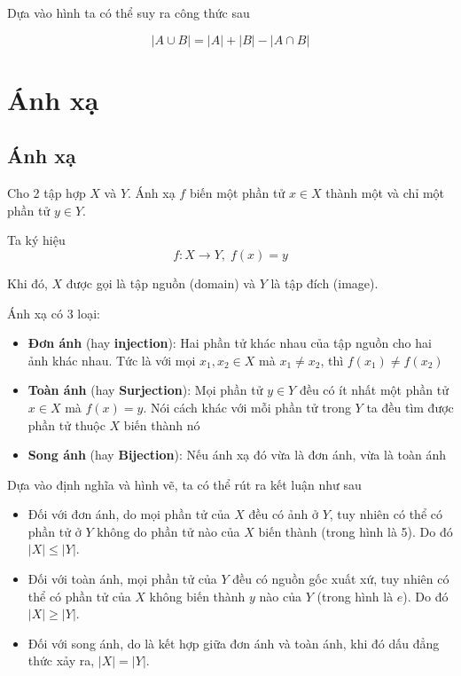 Dựa vào hình ta có thể suy ra công thức sau

\begin{equation}
    \lvert A \cup B \rvert = \lvert A \rvert + \lvert B \rvert - \lvert A \cap B \rvert
\end{equation}

\section{Ánh xạ}

\subsection*{Ánh xạ}

Cho 2 tập hợp $X$ và $Y$. Ánh xạ $f$ biến một phần tử $x \in X$ thành một và chỉ một phần tử $y \in Y$.

Ta ký hiệu
\[f: X \to Y, \; f(x) = y\]

Khi đó, $X$ được gọi là tập nguồn (domain) và $Y$ là tập đích (image).

Ánh xạ có 3 loại:

\begin{itemize}
    \item \textbf{Đơn ánh} (hay \textbf{injection}): Hai phần tử khác nhau của tập nguồn cho hai ảnh khác nhau. Tức là với mọi $x_1, x_2 \in X$ mà $x_1 \neq x_2$, thì $f(x_1) \neq f(x_2)$
    \item \textbf{Toàn ánh} (hay \textbf{Surjection}): Mọi phần tử $y \in Y$ đều có ít nhất một phần tử $x \in X$ mà $f(x) = y$. Nói cách khác với mỗi phần tử trong $Y$ ta đều tìm được phần tử thuộc $X$ biến thành nó
    \item \textbf{Song ánh} (hay \textbf{Bijection}): Nếu ánh xạ đó vừa là đơn ánh, vừa là toàn ánh
\end{itemize}

Dựa vào định nghĩa và hình vẽ, ta có thể rút ra kết luận như sau
\begin{itemize}
    \item Đối với đơn ánh, do mọi phần tử của $X$ đều có ảnh ở $Y$, tuy nhiên có thể có phần tử ở $Y$ không do phần tử nào của $X$ biến thành (trong hình là 5). Do đó $\lvert X \rvert \leqslant \lvert Y \rvert$.
    \item Đối với toàn ánh, mọi phần tử của $Y$ đều có nguồn gốc xuất xứ, tuy nhiên có thể có phần tử của $X$ không biến thành $y$ nào của $Y$ (trong hình là $e$). Do đó $\lvert X \rvert \geqslant \lvert Y \rvert$.
    \item Đối với song ánh, do là kết hợp giữa đơn ánh và toàn ánh, khi đó dấu đẳng thức xảy ra, $\lvert X \rvert = \lvert Y \rvert$.
\end{itemize}

